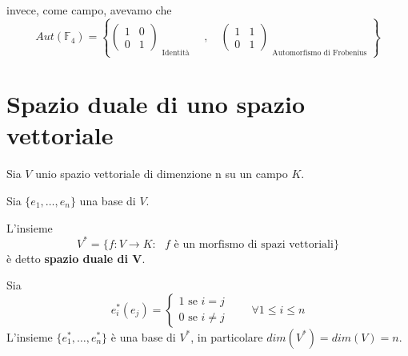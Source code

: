 \documentclass[../main.tex]{subfiles}
\begin{document}
\begin{example}
    invece, come campo, avevamo che
    \begin{equation*}
        Aut(\mathbb{F}_4) = \left\{
        \begin{pmatrix}
            1 & 0 \\
            0 & 1
        \end{pmatrix}_{\substack{\text{Identità}}}
        \quad,\quad
        \begin{pmatrix}
            1 & 1 \\
            0 & 1
        \end{pmatrix}_{\substack{\text{Automorfismo di Frobenius}}}
        \right\}
    \end{equation*}
\end{example}

\section{Spazio duale di uno spazio vettoriale}
\begin{definition}
    Sia $V$ unio spazio vettoriale di dimenzione n su un campo $K$.

    Sia $\{e_1, \ldots, e_n\}$ una base di $V$.

    L'insieme
    \begin{equation*}
        V^* = \{f : V \rightarrow K : \text{ $f$ è un morfismo di spazi vettoriali} \}
    \end{equation*}
    è detto \textbf{spazio duale di V}.

    Sia
    \begin{equation*}
        e^*_i(e_j)= \begin{cases}
            1 \text{ se } i = j \\
            0 \text{ se } i \neq j
        \end{cases} \qquad \forall 1 \leq i \leq n
    \end{equation*}
    L'insieme $\{e^*_1, \ldots, e^*_n\}$ è una base di $V^*$, in particolare $dim(V^*) = dim(V) = n$.
\end{definition}
\end{document}
